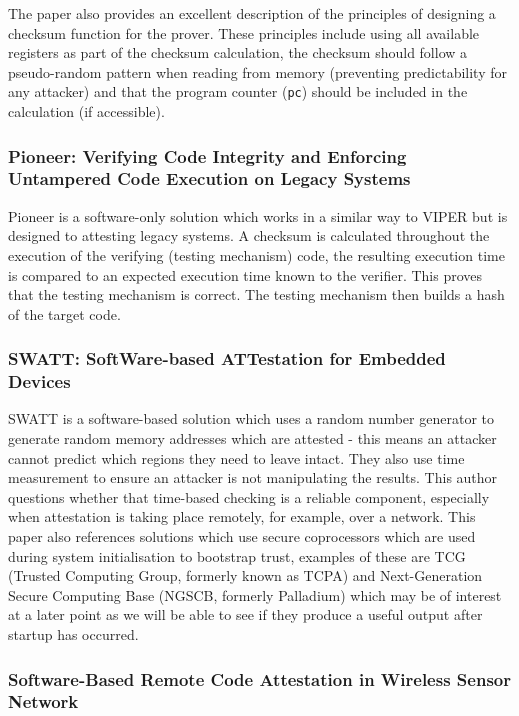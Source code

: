 The paper \cite{Li2011} also provides an excellent description of the principles of designing a checksum function for the prover. These principles include using all available registers as part of the checksum calculation, the checksum should follow a pseudo-random pattern when reading from memory (preventing predictability for any attacker) and that the program counter (\verb|pc|) should be included in the calculation (if accessible). 

\subsubsection{Pioneer: Verifying Code Integrity and Enforcing Untampered Code Execution on Legacy Systems}

Pioneer \cite{Seshadri2007} is a software-only solution which works in a similar way to VIPER but is designed to attesting legacy systems. A checksum is calculated throughout the execution of the verifying (testing mechanism) code, the resulting execution time is compared to an expected execution time known to the verifier. This proves that the testing mechanism is correct. The testing mechanism then builds a hash of the target code. 

\subsubsection{SWATT: SoftWare-based ATTestation for Embedded Devices}

SWATT \cite{Seshadri2004} is a software-based solution which uses a random number generator to generate random memory addresses which are attested - this means an attacker cannot predict which regions they need to leave intact. They also use time measurement to ensure an attacker is not manipulating the results. This author questions whether that time-based checking is a reliable component, especially when attestation is taking place remotely, for example, over a network.
\ifnotesincluded
{} 
\fi
This paper also references solutions which use secure coprocessors which are used during system initialisation to bootstrap trust, examples of these are TCG (Trusted Computing Group, formerly known as TCPA) and Next-Generation Secure Computing Base (NGSCB, formerly Palladium) which may be of interest at a later point as we will be able to see if they produce a useful output after startup has occurred.

\subsubsection{Software-Based Remote Code Attestation in Wireless Sensor Network}

